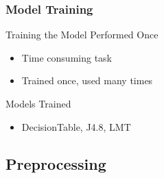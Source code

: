 \documentclass{beamer}
\begin{document}
\begin{frame}
	\frametitle{Model Training}
	\begin{block}{Training the Model}
		Performed Once
		\begin{itemize}
			\item Time consuming task
			\item Trained once, used many times
		\end{itemize}
		Models Trained
		\begin{itemize}
			\item DecisionTable, J4.8, LMT
		\end{itemize}
	\end{block}
\end{frame}

\subsection{Preprocessing} 
\end{document}
